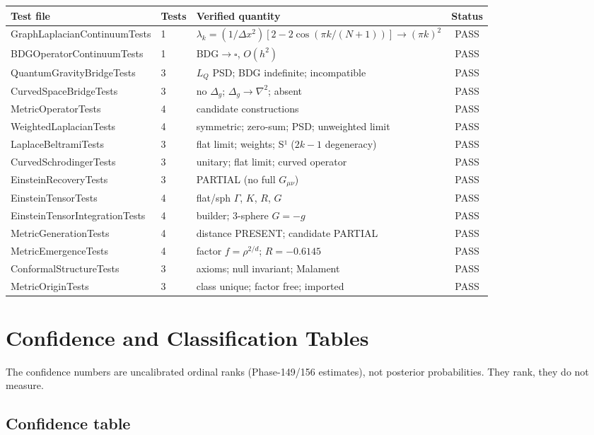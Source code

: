 \documentclass[10pt,twoside,openany]{book}
\begin{document}
\begin{longtable}{lllc}
\toprule
Test file & Tests & Verified quantity & Status \\
\midrule
\endhead
GraphLaplacianContinuumTests & 1 & $\lambda_k=(1/\Delta x^2)[2-2\cos(\pi k/(N{+}1))]\to(\pi k)^2$ & PASS \\
BDGOperatorContinuumTests & 1 & BDG$\to\square$, $O(h^2)$ & PASS \\
QuantumGravityBridgeTests & 3 & $L_Q$ PSD; BDG indefinite; incompatible & PASS \\
CurvedSpaceBridgeTests & 3 & no $\Delta_g$; $\Delta_g\to\nabla^2$; absent & PASS \\
MetricOperatorTests & 4 & candidate constructions & PASS \\
WeightedLaplacianTests & 4 & symmetric; zero-sum; PSD; unweighted limit & PASS \\
LaplaceBeltramiTests & 3 & flat limit; weights; S¹ ($2k{-}1$ degeneracy) & PASS \\
CurvedSchrodingerTests & 3 & unitary; flat limit; curved operator & PASS \\
EinsteinRecoveryTests & 3 & PARTIAL (no full $G_{\mu\nu}$) & PASS \\
EinsteinTensorTests & 4 & flat/sph $\Gamma$, $K$, $R$, $G$ & PASS \\
EinsteinTensorIntegrationTests & 4 & builder; 3-sphere $G=-g$ & PASS \\
MetricGenerationTests & 4 & distance PRESENT; candidate PARTIAL & PASS \\
MetricEmergenceTests & 4 & factor $f=\rho^{2/d}$; $R=-0.6145$ & PASS \\
ConformalStructureTests & 3 & axioms; null invariant; Malament & PASS \\
MetricOriginTests & 3 & class unique; factor free; imported & PASS \\
\bottomrule
\end{longtable}

\chapter{Confidence and Classification Tables}
\label{app:confidence}

The confidence numbers are uncalibrated ordinal ranks (Phase-149/156 estimates), not
posterior probabilities. They rank, they do not measure.

\section{Confidence table}
\end{document}
